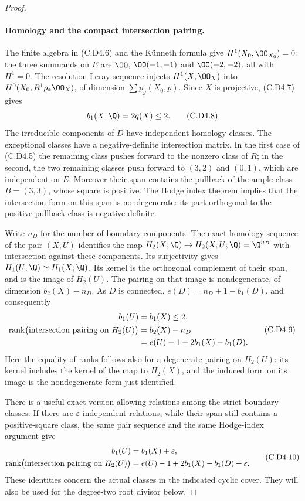 \begin{proof}
\paragraph{Homology and the compact intersection pairing.}
The finite algebra in (C.D4.6) and the K\"unneth formula give
$H^1(X_0,\OO_{X_0})=0$: the three summands on $E$ are
$\OO$, $\OO(-1,-1)$ and $\OO(-2,-2)$, all with $H^1=0$.
The resolution Leray sequence injects $H^1(X,\OO_X)$ into
$H^0(X_0,R^1\rho_*\OO_X)$, of dimension
$\sum p_g(X_0,p)$. Since $X$ is projective, (C.D4.7) gives
\[
                         b_1(X;\Q)=2q(X)\le2.
\tag{C.D4.8}
\]
The irreducible components of $D$ have independent homology
classes. The exceptional classes have a negative-definite
intersection matrix. In the first case of (C.D4.5) the
remaining class pushes forward to the nonzero class of $R$;
in the second, the two remaining classes push forward to
$(3,2)$ and $(0,1)$, which are independent on $E$.
Moreover their span contains the pullback of the ample
class $B=(3,3)$, whose square is positive. The Hodge index
theorem implies that the intersection form on this span is
nondegenerate: its part orthogonal to the positive pullback
class is negative definite.

Write $n_D$ for the number of boundary components. The exact
homology sequence of the pair $(X,U)$ identifies the map
$H_2(X;\Q)\to H_2(X,U;\Q)=\Q^{n_D}$ with intersection
against these components. Its surjectivity gives
$H_1(U;\Q)\simeq H_1(X;\Q)$. Its kernel is the orthogonal
complement of their span, and is the image of $H_2(U)$.
The pairing on that image is nondegenerate, of dimension
$b_2(X)-n_D$. As $D$ is connected,
$e(D)=n_D+1-b_1(D)$, and consequently
\[
\begin{split}
 b_1(U)&=b_1(X)\le2,\\
 \operatorname{rank}\bigl(\hbox{intersection pairing on }H_2(U)\bigr)
     &=b_2(X)-n_D\\
     &=e(U)-1+2b_1(X)-b_1(D).
\end{split}
\tag{C.D4.9}
\]
Here the equality of ranks follows also for a degenerate
pairing on $H_2(U)$: its kernel includes the kernel of the
map to $H_2(X)$, and the induced form on its image is the
nondegenerate form just identified.

There is a useful exact version allowing relations among
the strict boundary classes. If there are $\varepsilon$
independent relations, while their span still contains a
positive-square class, the same pair sequence and the same
Hodge-index argument give
\[
\begin{split}
 b_1(U)&=b_1(X)+\varepsilon,\\
 \operatorname{rank}\bigl(\hbox{intersection pairing on }H_2(U)\bigr)
 &=e(U)-1+2b_1(X)-b_1(D)+\varepsilon.
\end{split}
\tag{C.D4.10}
\]
These identities concern the actual classes in the indicated
cyclic cover. They will also be used for the degree-two
root divisor below.


\end{proof}
